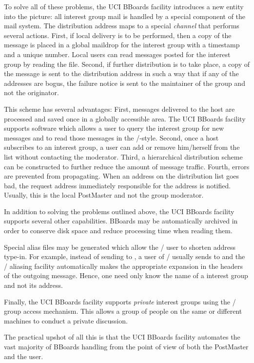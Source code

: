To solve all of these problems,
the UCI BBoards facility introduces a new entity into the picture:
all interest group mail is handled by a special component of the mail system.
The distribution address maps to a special {\it channel} that performs
several actions.
First, if local delivery is to be performed,
then a copy of the message is placed in a global maildrop for the interest
group with a timestamp and a unique number.
Local users can read messages posted for the interest group by reading the
file.
Second, if further distribution is to take place,
a copy of the message is sent to the distribution address in such a way that
if any of the addresses are bogus,
the failure notice is sent to the maintainer of the group and not the
originator.

This scheme has several advantages:
First, messages delivered to the host are processed and saved once
in a globally accessible area.
The UCI BBoards facility supports software which allows a user to query the
interest group for new messages and to read those messages in the \MH/-style.
Second, once a host subscribes to an interest group,
a user can add or remove him/herself from the list without contacting the
moderator.
Third, a hierarchical distribution scheme can be constructed to further
reduce the amount of message traffic.
Fourth, errors are prevented from propagating.
When an address on the distribution list goes bad,
the request address immediately responsible for the address is notified.
Usually, this is the local PostMaster and not the group moderator.

In addition to solving the problems outlined above,
the UCI BBoards facility supports several other capabilities.
BBoards may be automatically archived in order to conserve disk space and
reduce processing time when reading them.

Special alias files may be generated which allow the \MH/ user to shorten
address type-in.
For example, instead of sending to ,
a user of \MH/ usually sends to  and the \MH/ aliasing
facility automatically makes the appropriate expansion in the headers of the
outgoing message.
Hence, one need only know the name of a interest group and not its address.

Finally, the UCI BBoards facility supports {\it private} interest groups
using the \unix/ group access mechanism.
This allows a group of people on the same or different machines to conduct a
private discussion.

The practical upshot of all this is that the UCI BBoards facility automates
the vast majority of BBoards handling from the point of view of both the
PostMaster and the user.

